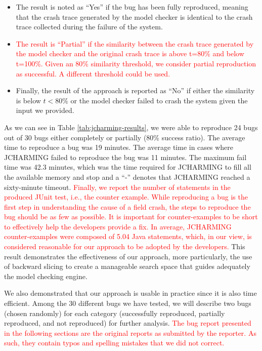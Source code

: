 \documentclass[times, doublespace]{smrauth}
\newcommand{\red}[1]{\textcolor{red}{#1}}
\begin{document}
{\begin{itemize}
  \item The result is noted as ``Yes'' if the bug has been fully
reproduced, meaning that the crash trace generated by the
model checker is identical to the crash trace collected
during the failure of the system.
\item \red{The result is ``Partial'' if the similarity between the crash
trace generated by the model checker and the original
crash trace is above t=80\% and below t=100\%. Given an 80\% similarity
threshold, we consider partial reproduction as successful.
A different threshold could be used.}
\item Finally, the result of the approach is reported as ``No'' if
either the similarity is below $t < 80\%$ or the model
checker failed to crash the system given the input we
provided.
\end{itemize}


As we can see in Table \ref{tab:jcharming-results}, we were able to reproduce 24 bugs
out of 30 bugs either completely or partially (80\% success ratio). The average time to reproduce a bug was 19 minutes. The average time in cases where JCHARMING failed to reproduce the bug  was 11 minutes. The maximum fail time was 42.3 minutes, which was the time
required for JCHARMING to fill all the available memory and stop and a ``-'' denotes that JCHARMING reached a sixty-minute timeout.
\red{Finally, we report the number of statements in the produced JUnit test, i.e., the counter example.
While reproducing a bug is the first step in understanding the cause of a field crash, the steps to reproduce the bug should be as few as possible.
It is important for counter-examples to be short to effectively help the developers provide a fix.
In average, JCHARMING counter-examples were composed of 5.04 Java statements, which, in our view, is considered reasonable for our approach to be adopted by the developers.
}
This result demonstrates the effectiveness of our approach,
more particularly, the use of backward slicing to create a
manageable search space that guides adequately the model
checking engine.} We also demonstrated that our approach is usable
in practice since it is also time efficient. Among the 30 different bugs we have tested, we will describe
two bugs (chosen randomly) for each category (successfully
reproduced, partially reproduced, and not reproduced) for
further analysis.
\red{The bug report presented in the following sections are the original reports as submitted by the reporter.
As such, they contain typos and spelling mistakes that we did not correct.}
\end{document}
